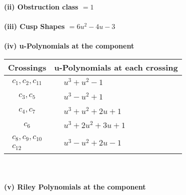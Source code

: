 \documentclass[1p]{elsarticle_modified}
\theoremstyle{definition}
\begin{document}
\flushleft \textbf{(ii) Obstruction class $= 1$}\\~\\
\flushleft \textbf{(iii) Cusp Shapes $= 6 u^2-4 u-3$}\\~\\
\newpage\renewcommand{\arraystretch}{1}
\flushleft \textbf{(iv) u-Polynomials at the component}\newline \\
\begin{tabular}{m{50pt}|m{274pt}}
Crossings & \hspace{64pt}u-Polynomials at each crossing \\
\hline $$\begin{aligned}c_{1},c_{2},c_{11}\end{aligned}$$&$\begin{aligned}
&u^3+u^2-1
\end{aligned}$\\
\hline $$\begin{aligned}c_{3},c_{5}\end{aligned}$$&$\begin{aligned}
&u^3- u^2+1
\end{aligned}$\\
\hline $$\begin{aligned}c_{4},c_{7}\end{aligned}$$&$\begin{aligned}
&u^3+u^2+2 u+1
\end{aligned}$\\
\hline $$\begin{aligned}c_{6}\end{aligned}$$&$\begin{aligned}
&u^3+2 u^2+3 u+1
\end{aligned}$\\
\hline $$\begin{aligned}c_{8},c_{9},c_{10}\\c_{12}\end{aligned}$$&$\begin{aligned}
&u^3- u^2+2 u-1
\end{aligned}$\\
\hline
\end{tabular}\\~\\
\newpage\renewcommand{\arraystretch}{1}
\flushleft \textbf{(v) Riley Polynomials at the component}\newline \\
\end{document}
